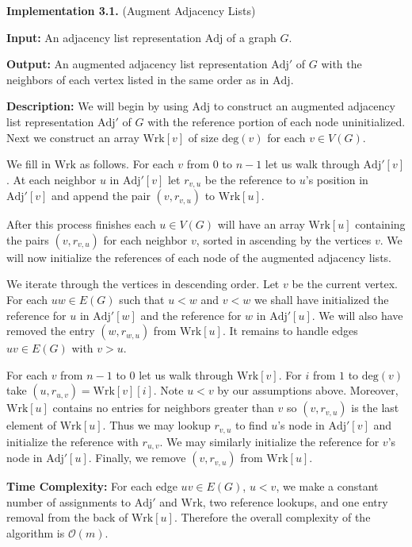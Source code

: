 \documentclass[letterpaper, 12pt]{article}
\theoremstyle{definition}
\theoremstyle{definition}
\theoremstyle{thm}
\theoremstyle{definition}
\begin{document}
\noindent\textbf{Implementation 3.1.} (Augment Adjacency Lists)

\noindent\textbf{Input:} An adjacency list representation $\text{Adj}$ of a
graph $G$.

\noindent\textbf{Output:} An augmented adjacency list representation
$\text{Adj}'$ of $G$ with the neighbors of each vertex listed in the same order
as in $\text{Adj}$.

\noindent\textbf{Description:} We will begin by using $\text{Adj}$ to construct
an augmented adjacency list representation $\text{Adj}'$ of $G$ with the
reference portion of each node uninitialized.
Next we construct an array $\text{Wrk}[v]$ of size $\text{deg}(v)$ for each
$v\in V(G)$.

We fill in $\text{Wrk}$ as follows. For each $v$ from $0$ to $n-1$ let us walk
through $\text{Adj}'[v]$. At each neighbor $u$ in $\text{Adj}'[v]$ let
$r_{v,u}$ be the reference to $u$'s position in $\text{Adj}'[v]$ and append the
pair $(v,r_{v,u})$ to $\text{Wrk}[u]$.

After this process finishes each $u\in V(G)$ will have an array $\text{Wrk}[u]$
containing the pairs $(v,r_{v,u})$ for each neighbor $v$, sorted in ascending by
the vertices $v$. We will now initialize the references of each node of the
augmented adjacency lists.

We iterate through the vertices in descending order. Let $v$ be the current
vertex. For each 
$uw\in E(G)$ such that $u<w$ and $v<w$ we shall have initialized the reference
for $u$ in $\text{Adj}'[w]$ and the reference for $w$ in $\text{Adj}'[u]$. We
will also have removed the entry $(w,r_{w,u})$ from $\text{Wrk}[u]$. It remains
to handle edges $uv\in E(G)$ with $v>u$.

For each $v$ from $n-1$ to $0$ let us walk through $\text{Wrk}[v]$. For $i$ from
$1$ to $\text{deg}(v)$ take $(u,r_{u,v})=\text{Wrk}[v][i]$. Note $u<v$ by our
assumptions above. Moreover, $\text{Wrk}[u]$ contains no entries for neighbors
greater than $v$ so $(v,r_{v,u})$ is the last element of $\text{Wrk}[u]$. Thus
we may lookup $r_{v,u}$ to find $u$'s node in $\text{Adj}'[v]$ and initialize the
reference with $r_{u,v}$. We may similarly initialize the reference for $v$'s
node in $\text{Adj}'[u]$. Finally, we remove $(v,r_{v,u})$ from $\text{Wrk}[u]$.

\noindent\textbf{Time Complexity:} For each edge $uv\in E(G)$, $u<v$, we make a
constant number of assignments to $\text{Adj}'$ and $\text{Wrk}$, two reference
lookups, and one entry removal from the back of $\text{Wrk}[u]$.
Therefore the overall complexity of the algorithm is $\mathcal{O}(m)$.\\
\end{document}
